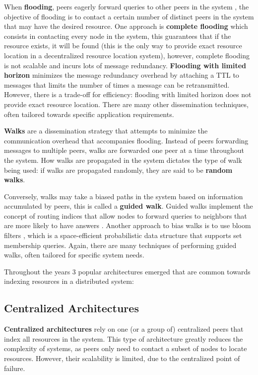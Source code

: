 When \textbf{flooding}, peers eagerly forward queries to other peers in the system , the objective of flooding is to contact a certain number of distinct peers in the system that may have the desired resource. One approach is \textbf{complete flooding} which consists in contacting every node in the system, this guarantees that if the resource exists, it will be found (this is the only way to provide exact resource location in a decentralized resource location system), however, complete flooding is not scalable and incurs lots of message redundancy. \textbf{Flooding with limited horizon} minimizes the message redundancy overhead by attaching a TTL to messages that limits the number of times a message can be retransmitted. However, there is a trade-off for efficiency: flooding with limited horizon does not provide exact resource location. There are many other dissemination techniques, often tailored towards specific application requirements.

\textbf{Walks} are a dissemination strategy that attempts to minimize the communication overhead that accompanies flooding. Instead of peers forwarding messages to multiple peers, walks are forwarded one peer at a time throughout the system. How walks are propagated in the system dictates the type of walk being used: if walks are propagated randomly, they are said to be \textbf{random walks}.

Conversely, walks may take a biased paths in the system based on information accumulated by peers, this is called a \textbf{guided walk}. Guided walks implement the concept of routing indices that allow nodes to forward queries to neighbors that are more likely to have answers \cite{1022239}. Another approach to bias walks is to use bloom filters \cite{5751342}, which is a space-efficient probabilistic data structure that supports set membership queries. Again, there are many techniques of performing guided walks, often  tailored for specific system needs. 

Throughout the years 3 popular architectures emerged that are common towards indexing resources in a distributed system:

\subsection{Centralized Architectures}

\textbf{Centralized architectures} rely on one (or a group of) centralized peers that index all resources in the system. This type of architecture greatly reduces the complexity of systems, as peers only need to contact a subset of nodes to locate resources. However, their scalability is limited, due to the centralized point of failure. 

